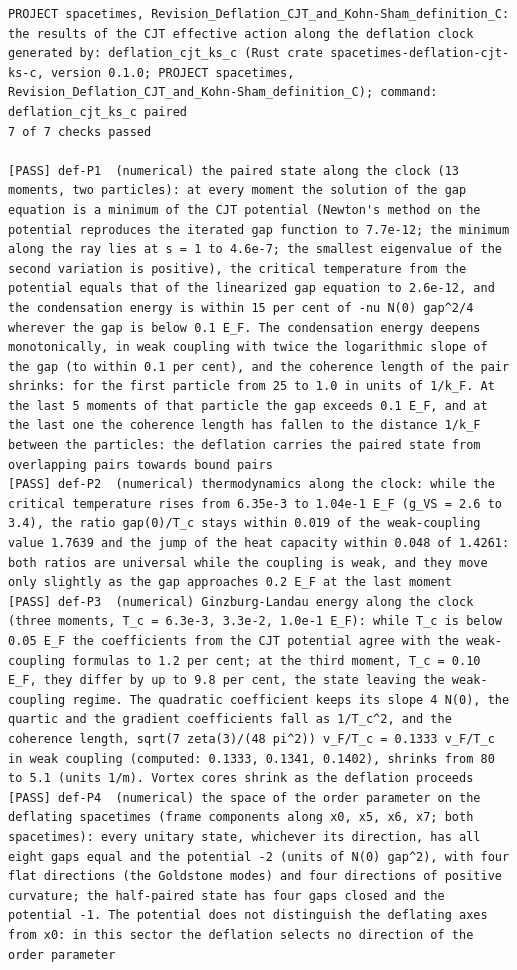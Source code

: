 \documentclass[
  10pt,
]{article}
\begin{document}
\begin{verbatim}
PROJECT spacetimes, Revision_Deflation_CJT_and_Kohn-Sham_definition_C: the results of the CJT effective action along the deflation clock
generated by: deflation_cjt_ks_c (Rust crate spacetimes-deflation-cjt-ks-c, version 0.1.0; PROJECT spacetimes, Revision_Deflation_CJT_and_Kohn-Sham_definition_C); command: deflation_cjt_ks_c paired
7 of 7 checks passed

[PASS] def-P1  (numerical) the paired state along the clock (13 moments, two particles): at every moment the solution of the gap equation is a minimum of the CJT potential (Newton's method on the potential reproduces the iterated gap function to 7.7e-12; the minimum along the ray lies at s = 1 to 4.6e-7; the smallest eigenvalue of the second variation is positive), the critical temperature from the potential equals that of the linearized gap equation to 2.6e-12, and the condensation energy is within 15 per cent of -nu N(0) gap^2/4 wherever the gap is below 0.1 E_F. The condensation energy deepens monotonically, in weak coupling with twice the logarithmic slope of the gap (to within 0.1 per cent), and the coherence length of the pair shrinks: for the first particle from 25 to 1.0 in units of 1/k_F. At the last 5 moments of that particle the gap exceeds 0.1 E_F, and at the last one the coherence length has fallen to the distance 1/k_F between the particles: the deflation carries the paired state from overlapping pairs towards bound pairs
[PASS] def-P2  (numerical) thermodynamics along the clock: while the critical temperature rises from 6.35e-3 to 1.04e-1 E_F (g_VS = 2.6 to 3.4), the ratio gap(0)/T_c stays within 0.019 of the weak-coupling value 1.7639 and the jump of the heat capacity within 0.048 of 1.4261: both ratios are universal while the coupling is weak, and they move only slightly as the gap approaches 0.2 E_F at the last moment
[PASS] def-P3  (numerical) Ginzburg-Landau energy along the clock (three moments, T_c = 6.3e-3, 3.3e-2, 1.0e-1 E_F): while T_c is below 0.05 E_F the coefficients from the CJT potential agree with the weak-coupling formulas to 1.2 per cent; at the third moment, T_c = 0.10 E_F, they differ by up to 9.8 per cent, the state leaving the weak-coupling regime. The quadratic coefficient keeps its slope 4 N(0), the quartic and the gradient coefficients fall as 1/T_c^2, and the coherence length, sqrt(7 zeta(3)/(48 pi^2)) v_F/T_c = 0.1333 v_F/T_c in weak coupling (computed: 0.1333, 0.1341, 0.1402), shrinks from 80 to 5.1 (units 1/m). Vortex cores shrink as the deflation proceeds
[PASS] def-P4  (numerical) the space of the order parameter on the deflating spacetimes (frame components along x0, x5, x6, x7; both spacetimes): every unitary state, whichever its direction, has all eight gaps equal and the potential -2 (units of N(0) gap^2), with four flat directions (the Goldstone modes) and four directions of positive curvature; the half-paired state has four gaps closed and the potential -1. The potential does not distinguish the deflating axes from x0: in this sector the deflation selects no direction of the order parameter

\end{verbatim}
\end{document}
